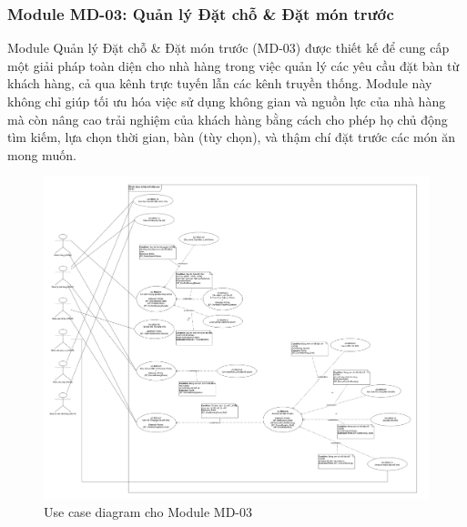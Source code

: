\subsubsection{Module MD-03: Quản lý Đặt chỗ \& Đặt món trước}
Module Quản lý Đặt chỗ \& Đặt món trước (MD-03) được thiết kế để cung cấp một giải pháp toàn diện cho nhà hàng trong việc quản lý các yêu cầu đặt bàn từ khách hàng, cả qua kênh trực tuyến lẫn các kênh truyền thống. Module này không chỉ giúp tối ưu hóa việc sử dụng không gian và nguồn lực của nhà hàng mà còn nâng cao trải nghiệm của khách hàng bằng cách cho phép họ chủ động tìm kiếm, lựa chọn thời gian, bàn (tùy chọn), và thậm chí đặt trước các món ăn mong muốn.



\begin{figure}[H]
    \centering
    \includegraphics[width=15cm]{Sections/tong_quan/functional_spec/img/uc3.png}
    \vspace{0.5cm}
    \caption{Use case diagram cho Module MD-03}
    \label{fig:my_label}
\end{figure}

